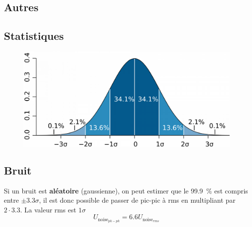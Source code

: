 \documentclass[]{article}
\begin{document}
\begin{multicols}{3}
\section{Autres}
\subsection{Statistiques}
\begin{figure}[H]
\centering
\includegraphics[width=0.6\columnwidth]{gauss.png}
\end{figure}
\subsection{Bruit}
Si un bruit est \textbf{aléatoire} (gaussienne), on peut estimer que le \SI{99.9}{\percent} est compris entre $\pm 3.3\sigma$, il est donc possible de passer de pic-pic à rms en multipliant par $2\cdot 3.3$. La valeur rms est $1\sigma$
$$U_{\text{noise}_{pk-pk}}=6.6 U_{\text{noise}_{rms}}$$
\end{multicols}
\end{document}
